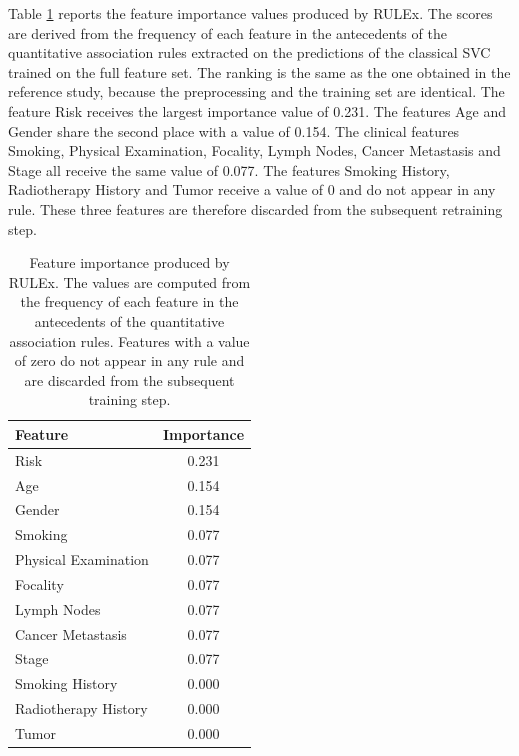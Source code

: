Table \ref{tab:rulex} reports the feature importance values produced by RULEx. The scores are derived from the frequency of each feature in the antecedents of the quantitative association rules extracted on the predictions of the classical SVC trained on the full feature set. The ranking is the same as the one obtained in the reference study, because the preprocessing and the training set are identical. The feature Risk receives the largest importance value of 0.231. The features Age and Gender share the second place with a value of 0.154. The clinical features Smoking, Physical Examination, Focality, Lymph Nodes, Cancer Metastasis and Stage all receive the same value of 0.077. The features Smoking History, Radiotherapy History and Tumor receive a value of 0 and do not appear in any rule. These three features are therefore discarded from the subsequent retraining step.

\begin{table}[t]
\centering
\caption{Feature importance produced by RULEx. The values are computed from the frequency of each feature in the antecedents of the quantitative association rules. Features with a value of zero do not appear in any rule and are discarded from the subsequent training step.}
\label{tab:rulex}
\begin{tabular}{lc}
\hline
Feature & Importance \\
\hline
Risk                  & 0.231 \\
Age                   & 0.154 \\
Gender                & 0.154 \\
Smoking               & 0.077 \\
Physical Examination  & 0.077 \\
Focality              & 0.077 \\
Lymph Nodes           & 0.077 \\
Cancer Metastasis     & 0.077 \\
Stage                 & 0.077 \\
Smoking History       & 0.000 \\
Radiotherapy History  & 0.000 \\
Tumor                 & 0.000 \\
\hline
\end{tabular}
\end{table}

